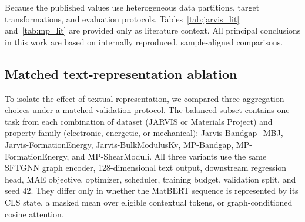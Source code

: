 \documentclass[a4paper,fleqn]{cas-sc}
\begin{document}
\begin{table}[pos=H]
\caption{Reference comparison under different protocols on Materials Project. MAE units are eV/atom for formation energy, eV for band gap, and $\log_{10}(\mathrm{GPa})$ for elastic moduli. Published values follow the evaluation protocol of each study. Bold values mark the lowest reported MAE and underlined values the second-lowest reported MAE in each property column for visual reference only. Because data partitions, target transformations, and test protocols differ across studies, these marks do not constitute a protocol-matched cross-study ranking.}
\label{tab:mp_lit}\centering\scriptsize
{}
\end{table}

Because the published values use heterogeneous data partitions, target transformations, and evaluation protocols, Tables~\ref{tab:jarvis_lit} and~\ref{tab:mp_lit} are provided only as literature context. All principal conclusions in this work are based on internally reproduced, sample-aligned comparisons.

\subsection{Matched text-representation ablation}
To isolate the effect of textual representation, we compared three aggregation choices under a matched validation protocol. The balanced subset contains one task from each combination of dataset (JARVIS or Materials Project) and property family (electronic, energetic, or mechanical): Jarvis-Bandgap\_MBJ, Jarvis-FormationEnergy, Jarvis-BulkModulusKv, MP-Bandgap, MP-FormationEnergy, and MP-ShearModuli. All three variants use the same SFTGNN graph encoder, 128-dimensional text output, downstream regression head, MAE objective, optimizer, scheduler, training budget, validation split, and seed 42. They differ only in whether the MatBERT sequence is represented by its CLS state, a masked mean over eligible contextual tokens, or graph-conditioned cosine attention.
\end{document}
